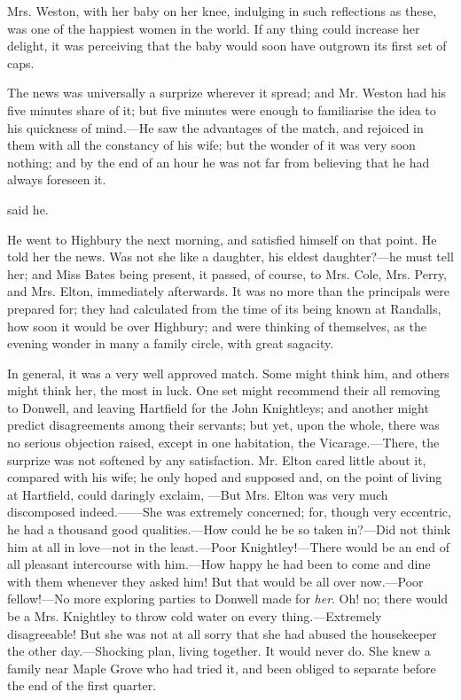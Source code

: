 Mrs. Weston, with her baby on her knee, indulging in such reflections as these, was one of the happiest women in the world. If any thing could increase her delight, it was perceiving that the baby would soon have outgrown its first set of caps.

The news was universally a surprize wherever it spread; and Mr. Weston had his five minutes share of it; but five minutes were enough to familiarise the idea to his quickness of mind.---He saw the advantages of the match, and rejoiced in them with all the constancy of his wife; but the wonder of it was very soon nothing; and by the end of an hour he was not far from believing that he had always foreseen it.

 said he. 

He went to Highbury the next morning, and satisfied himself on that point. He told her the news. Was not she like a daughter, his eldest daughter?---he must tell her; and Miss Bates being present, it passed, of course, to Mrs. Cole, Mrs. Perry, and Mrs. Elton, immediately afterwards. It was no more than the principals were prepared for; they had calculated from the time of its being known at Randalls, how soon it would be over Highbury; and were thinking of themselves, as the evening wonder in many a family circle, with great sagacity.

In general, it was a very well approved match. Some might think him, and others might think her, the most in luck. One set might recommend their all removing to Donwell, and leaving Hartfield for the John Knightleys; and another might predict disagreements among their servants; but yet, upon the whole, there was no serious objection raised, except in one habitation, the Vicarage.---There, the surprize was not softened by any satisfaction. Mr. Elton cared little about it, compared with his wife; he only hoped  and supposed  and, on the point of living at Hartfield, could daringly exclaim, ---But Mrs. Elton was very much discomposed indeed.------She was extremely concerned; for, though very eccentric, he had a thousand good qualities.---How could he be so taken in?---Did not think him at all in love---not in the least.---Poor Knightley!---There would be an end of all pleasant intercourse with him.---How happy he had been to come and dine with them whenever they asked him! But that would be all over now.---Poor fellow!---No more exploring parties to Donwell made for {\em her}. Oh! no; there would be a Mrs. Knightley to throw cold water on every thing.---Extremely disagreeable! But she was not at all sorry that she had abused the housekeeper the other day.---Shocking plan, living together. It would never do. She knew a family near Maple Grove who had tried it, and been obliged to separate before the end of the first quarter.

